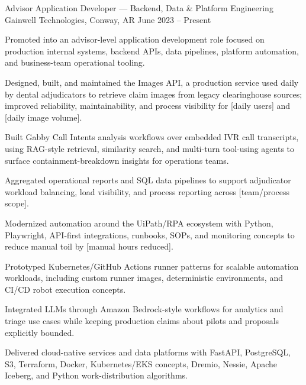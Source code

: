 


\begin{cventries}


\cventry
{Advisor Application Developer — Backend, Data \& Platform Engineering} %
{Gainwell Technologies, Conway, AR} %
{} %
{June 2023 -- Present} %
{ %
	\begin{cvitems}
		\item {Promoted into an advisor-level application development role focused on production internal systems, backend APIs, data pipelines, platform automation, and business-team operational tooling.}
		\item {Designed, built, and maintained the Images API, a production service used daily by dental adjudicators to retrieve claim images from legacy clearinghouse sources; improved reliability, maintainability, and process visibility for [daily users] and [daily image volume].}
		\item {Built Gabby Call Intents analysis workflows over embedded IVR call transcripts, using RAG-style retrieval, similarity search, and multi-turn tool-using agents to surface containment-breakdown insights for operations teams.}
		\item {Aggregated operational reports and SQL data pipelines to support adjudicator workload balancing, load visibility, and process reporting across [team/process scope].}
		\item {Modernized automation around the UiPath/RPA ecosystem with Python, Playwright, API-first integrations, runbooks, SOPs, and monitoring concepts to reduce manual toil by [manual hours reduced].}
		\item {Prototyped Kubernetes/GitHub Actions runner patterns for scalable automation workloads, including custom runner images, deterministic environments, and CI/CD robot execution concepts.}
		\item {Integrated LLMs through Amazon Bedrock-style workflows for analytics and triage use cases while keeping production claims about pilots and proposals explicitly bounded.}
		\item {Delivered cloud-native services and data platforms with FastAPI, PostgreSQL, S3, Terraform, Docker, Kubernetes/EKS concepts, Dremio, Nessie, Apache Iceberg, and Python work-distribution algorithms.}
	\end{cvitems}
}


\end{cventries}
